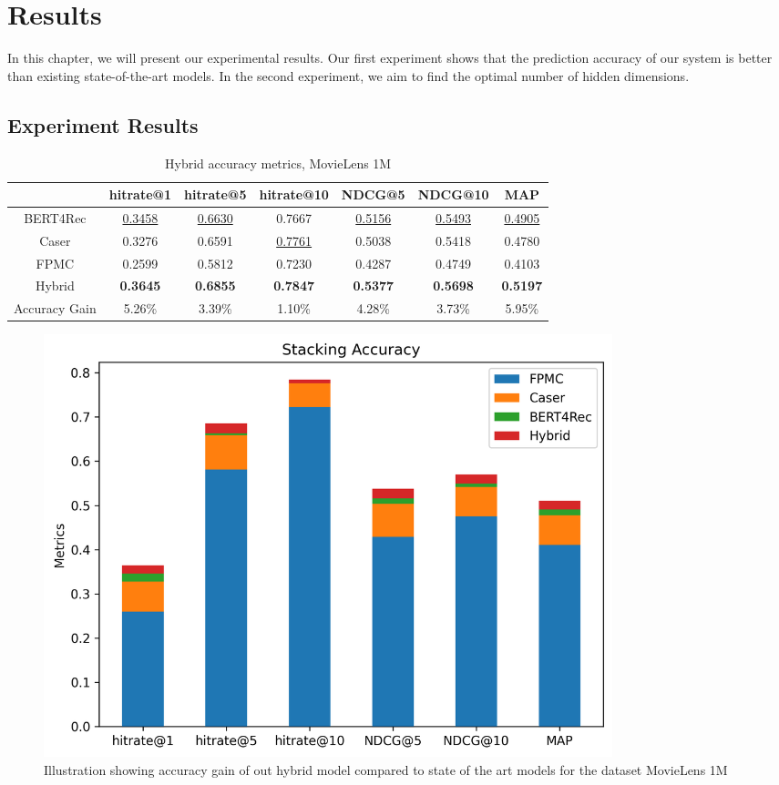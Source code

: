 \chapter{Results}


In this chapter, we will present our experimental results. Our first experiment shows that the prediction accuracy of our system is better than existing state-of-the-art models. In the second experiment, we aim to find the optimal number of hidden dimensions.

\section{Experiment Results}

\begin{table}[htbp!]
\centering
 \begin{tabular}{||c c c c c c c||} 
 \hline
  & hitrate@1 & hitrate@5 & hitrate@10 & NDCG@5 & NDCG@10 & MAP\\ [0.5ex] 
 \hline\hline
 BERT4Rec & \underline{0.3458} & \underline{0.6630} & 0.7667 & \underline{0.5156} & \underline{0.5493} & \underline{0.4905} \\ 
 Caser & 0.3276 & 0.6591 & \underline{0.7761} & 0.5038 & 0.5418 & 0.4780 \\
 FPMC & 0.2599 & 0.5812 & 0.7230 & 0.4287 & 0.4749 & 0.4103 \\
 \hline
 Hybrid & \textbf{0.3645} & \textbf{0.6855} & \textbf{0.7847} & \textbf{0.5377} & \textbf{0.5698} & \textbf{0.5197} \\ 
 Accuracy Gain & 5.26\% & 3.39\% & 1.10\% & 4.28\% & 3.73\% & 5.95\% \\
 \hline
\end{tabular}
\caption{Hybrid accuracy metrics, MovieLens 1M}
\label{tab:accuracy_hybrid_movielens}
\end{table}

\begin{figure}[htbp!]
\centering
\includegraphics[width=0.8\textwidth]{images/plots/stacking_accuracy_movielens.png}
\caption{Illustration showing accuracy gain of out hybrid model compared to state of the art models for the dataset MovieLens 1M}
\label{fig:accuracy_hybrid_movielens}
\end{figure}

